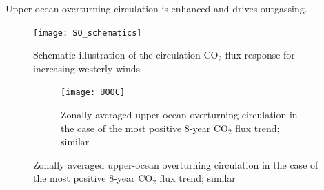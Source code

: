 \documentclass[aspectratio=169]{beamer}
\newcommand{\memberpositive}{m178_1985_1992} %
\begin{document}
\begin{frame}{Upper-ocean overturning circulation is enhanced and drives outgassing.}
\addtocounter{framenumber}{-1}
	\begin{minipage}{.3\textwidth}
		
		\begin{figure}[h!]
			\centering
			\vspace{-1mm}
			\texttt{[image: SO\_schematics]}
			\caption{Schematic illustration of the circulation CO$_2$ flux response for increasing westerly winds}
			\label{fig:schematics_neg}
		\end{figure}		
	
		
	\end{minipage} \hfill
	\begin{minipage}{.66\textwidth}
		\begin{figure}[h!]
		\begin{figure}[h!]
	\centering
	\texttt{[image: UOOC]}
	\caption{Zonally averaged upper-ocean overturning circulation in the case of the most positive 8-year CO$_2$ flux trend; similar \citep{DeVries2017}}
	\label{fig:UOOC_pos}
\end{figure}
		\end{figure}
	\end{minipage}

\end{frame}




	
\end{document}
